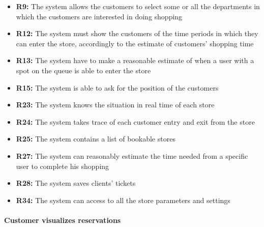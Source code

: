 \documentclass{article}
\begin{document}
\begin{center}
\begin{itemize}
					\item {\bfseries R9: } The system allows the customers to select some or all the departments in
which the customers are interested in doing shopping
					\item {\bfseries R12: } The system must show the customers of the time periods in which they can
					enter the store, accordingly to the estimate of customers' shopping time
					\item {\bfseries R13: } The system have to make a reasonable estimate of when a user with a spot
on the queue is able to enter the store
					\item {\bfseries R15: } The system is able to ask for the position of the customers
					\item {\bfseries R23: } The system knows the situation in real time of each store

					\item {\bfseries R24: } The system takes trace of each customer entry and exit from the store
					\item {\bfseries R25: } The system contains a list of bookable stores
					\item {\bfseries R27: } The system can reasonably estimate the time needed from a specific user
to complete his shopping

					\item {\bfseries R28: } The system saves clients' tickets
	\item {\bfseries R34: } The system can access to all the store parameters and settings

					\end{itemize}
				\end{center}
			
			\paragraph{Customer visualizes reservations}
			
\end{document}

